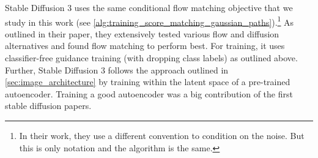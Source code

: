 Stable Diffusion 3 uses the same conditional flow matching objective that we study in this work (see \cref{alg:training_score_matching_gaussian_paths}).\footnote{In their work, they use a different convention to condition on the noise. But this is only notation and the algorithm is the same.} As outlined in their paper, they extensively tested various flow and diffusion alternatives and found flow matching to perform best. For training, it uses classifier-free guidance training (with dropping class labels) as outlined above. Further, Stable Diffusion 3 follows the approach outlined in \cref{sec:image_architecture} by training within the latent space of a pre-trained autoencoder. Training a good autoencoder was a big contribution of the first stable diffusion papers.\\

